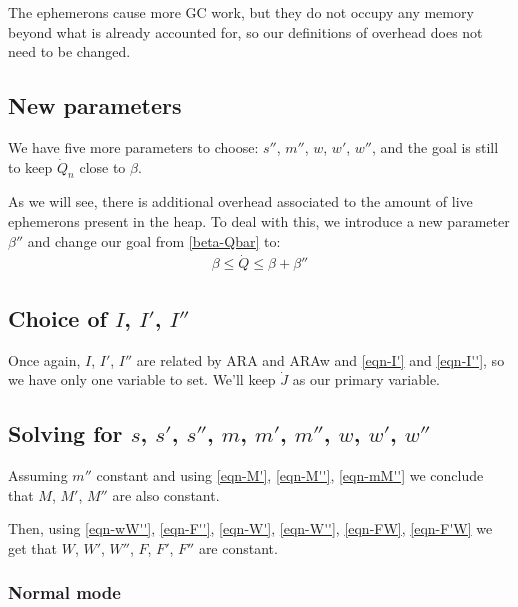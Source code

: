 \documentclass{article}
\begin{document}
The ephemerons cause more GC work, but they do not occupy any memory
beyond what is already accounted for, so our definitions of overhead
does not need to be changed.

\subsection{New parameters}

We have five more parameters to choose: $s''$, $m''$, $w$, $w'$,
$w''$, and the goal
is still to keep $\dot{Q}_n$ close to $\beta$.

As we will see, there is additional overhead associated to the amount
of live ephemerons present in the heap. To deal with this, we
introduce a new parameter $\beta''$ and change our goal from
\eqref{beta-Qbar} to:
\begin{gather}
\beta \leq \dot{Q} \leq \beta + \beta'' \label{beta''-Qbar}
\end{gather}


\subsection[Choice of I, I', I'']{Choice of $I$, $I'$, $I''$}

Once again, $I$, $I'$, $I''$ are related by ARA and ARAw and
\eqref{eqn-I'} and \eqref{eqn-I''}, so we have only one variable to
set. We'll keep $\dot{J}$ as our primary variable.


\subsection[Solving for s, s', s'', m, m', m'', w, w', w'']
{Solving for $s$, $s'$, $s''$, $m$, $m'$, $m''$, $w$, $w'$, $w''$}

Assuming $m''$ constant
and using \eqref{eqn-M'}, \eqref{eqn-M''},
\eqref{eqn-mM''} we conclude that $M$, $M'$, $M''$
are also constant.

Then, using \eqref{eqn-wW''}, \eqref{eqn-F''}, \eqref{eqn-W'},
\eqref{eqn-W''}, \eqref{eqn-FW}, \eqref{eqn-F'W} we get that $W$,
$W'$, $W''$, $F$, $F'$, $F''$ are constant.


\subsubsection{Normal mode}
\end{document}
